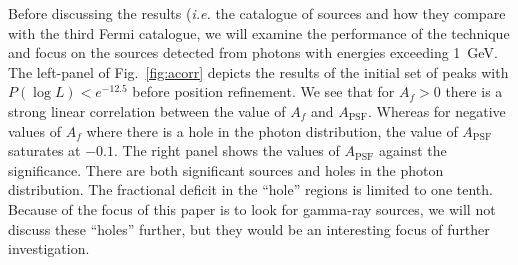 \documentclass[useAMS,usenatbib]{mn2e}
\begin{document}
Before discussing the results ({\em i.e.} the catalogue of sources and
how they compare with the third Fermi catalogue, we will examine the
performance of the technique and focus on the sources detected from
photons with energies exceeding 1~GeV.  The left-panel of
Fig.~\ref{fig:acorr} depicts the results of the initial set of peaks
with $P(\log L)<e^{-12.5}$ before position refinement.  We see that
for $A_f>0$ there is a strong linear correlation between the value of
$A_f$ and $A_\mathrm{PSF}$.  Whereas for negative values of $A_f$
where there is a hole in the photon distribution, the value of
$A_\mathrm{PSF}$ saturates at $-0.1$. The right panel shows the values
of $A_\mathrm{PSF}$ against the significance.  There are both
significant sources and holes in the photon distribution.  The
fractional deficit in the ``hole'' regions is limited to one tenth.
Because of the focus of this paper is to look for gamma-ray sources,
we will not discuss these ``holes'' further, but they would be an
interesting focus of further investigation. 
\end{document}
